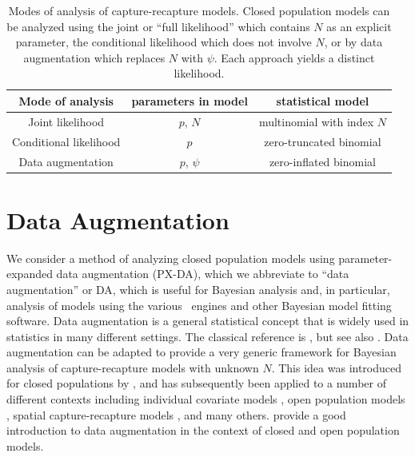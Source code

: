 \begin{table}[ht]
\centering
\caption{Modes of analysis of capture-recapture models. Closed
  population models can be analyzed using the joint or ``full
  likelihood'' which contains $N$ as an explicit parameter, the
  conditional likelihood which does not involve $N$, or by data
  augmentation which replaces $N$ with $\psi$. Each approach yields a
  distinct likelihood.}
\begin{tabular}{ccc}
\hline \hline
Mode of analysis & parameters in model & statistical model \\ \hline
Joint likelihood                &	$p$, $N$	&	multinomial with index $N$\\
Conditional likelihood 		&	$p$	&	zero-truncated binomial \\
Data augmentation		&	$p$, $\psi$	&
zero-inflated binomial\\
\hline
\end{tabular}
\label{tab.3.modes}
\end{table}



\section{Data Augmentation }
\label{closed.sec.da}

We consider a method of analyzing closed population models using
parameter-expanded data augmentation (PX-DA), which we abbreviate to
``data augmentation'' or DA, which is useful for Bayesian analysis
and, in particular, analysis of models using the various \bugs~engines
and other Bayesian model fitting software.  Data augmentation is a
general statistical concept that is widely used in statistics in many
different settings. The classical reference is
\citet{tanner_wong:1987}, but see also \citet{liu_wu:1999}.  Data
augmentation can be adapted to provide a very generic framework for
Bayesian analysis of capture-recapture models with unknown $N$. This
idea was introduced for closed populations by \citet{royle_etal:2007},
and has subsequently been applied to a number of different contexts
including individual covariate models \citep{royle:2009}, open
population models \citep{royle_dorazio:2008,royle_dorazio:2012,
  gardner_etal:2010ecol}, spatial capture-recapture models
\citep{royle_young:2008, royle_etal:2010, gardner_etal:2009}, and many
others. \citet[][Chapts. 6 and 10]{kery_schaub:2011} provide a good
introduction to data augmentation in the context of closed and open population
models.



